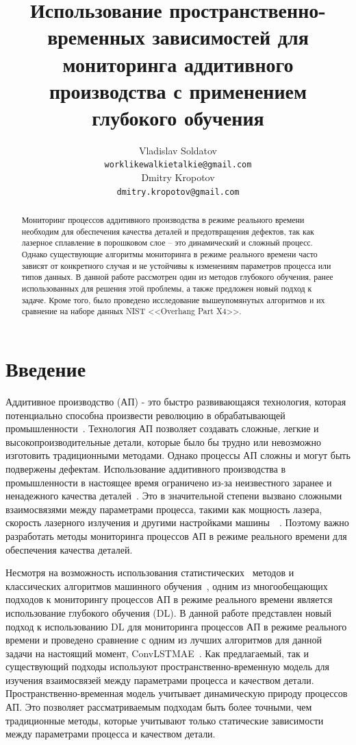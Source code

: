 \documentclass{article}
\title{Использование пространственно-временных зависимостей для мониторинга аддитивного производства с применением глубокого обучения}
\author{Vladislav Soldatov\\
	\texttt{worklikewalkietalkie@gmail.com} \\
	\And
	  Dmitry Kropotov \\
	\texttt{dmitry.kropotov@gmail.com} \\
}
\date{}
\begin{document}
\maketitle

\begin{abstract}
	Мониторинг процессов аддитивного производства в режиме реального времени необходим для обеспечения качества деталей и предотвращения дефектов, так как лазерное сплавление в порошковом слое -- это динамический и сложный процесс. Однако существующие алгоритмы мониторинга в режиме реального времени часто зависят от конкретного случая и не устойчивы к изменениям параметров процесса или типов данных. В данной работе рассмотрен один из методов глубокого обучения, ранее использованных для решения этой проблемы, а также предложен новый подход к задаче. Кроме того, было проведено исследование вышеупомянутых алгоритмов и их сравнение на наборе данных NIST <<Overhang Part X4>>. 
\end{abstract}



\section{Введение}
    Аддитивное производство (АП) - это быстро развивающаяся технология, которая потенциально способна произвести революцию в обрабатывающей промышленности~\cite{AMisCool}. Технология АП позволяет создавать сложные, легкие и высокопроизводительные детали, которые было бы трудно или невозможно изготовить традиционными методами. Однако процессы АП сложны и могут быть подвержены дефектам. Использование аддитивного производства в промышленности в настоящее время ограничено из-за неизвестного заранее и ненадежного качества деталей~\cite{Grasso2017ProcessDA}. Это в значительной степени вызвано сложными взаимосвязями между параметрами процесса, такими как мощность лазера, скорость лазерного излучения и другими настройками машины~\cite{pv_am}~\cite{am_of_metals_props}. Поэтому важно разработать методы мониторинга процессов АП в режиме реального времени для обеспечения качества деталей.

    Несмотря на возможность использования статистических~\cite{gaussian_process} методов и классических алгоритмов машинного обучения~\cite{classic_ml}, одним из многообещающих подходов к мониторингу процессов АП в режиме реального времени является использование глубокого обучения (DL). В данной работе представлен новый подход к использованию DL для мониторинга процессов АП в режиме реального времени и проведено сравнение с одним из лучших алгоритмов для данной задачи на настоящий момент, ConvLSTMAE~\cite{convlstm_nist}. Как предлагаемый, так и существующий подходы используют пространственно-временную модель для изучения взаимосвязей между параметрами процесса и качеством детали. Пространственно-временная модель учитывает динамическую природу процессов АП. Это позволяет рассматриваемым подходам быть более точными, чем традиционные методы, которые учитывают только статические зависимости между параметрами процесса и качеством детали.
\end{document}
